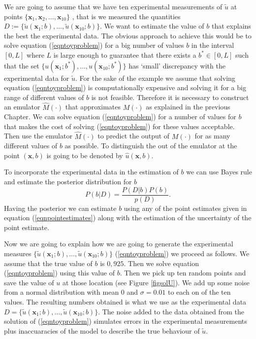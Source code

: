 \documentclass[12pt]{book}
\newcommand{\x}{\textbf{x}}
\begin{document}
We are going to assume that we have ten experimental measurements 
of $\tilde{u}$ at points $\{\x_{1},\x_{2},\ldots,\x_{10}\}$ , that is we measured the quantities 
$D:=\{\tilde{u}(\x_{1};b),\ldots,\tilde{u}(\x_{10};b)\}$.
We want to estimate the value of $b$ that explains the best the experimental data. The obvious approach to achieve this
would be to solve equation (\ref{eqntoyproblem}) for a big number of values $b$ in the interval $[0,L]$ where $L$ 
is large enough to guarantee that there exists a $b^{*}\in [0,L]$ such that the set $\{u(\x_{1};b^{*}),\ldots,u(\x_{10};b^{*})\}$
has `small' discrepancy with the experimental data for $\tilde{u}$. For the sake of the example we assume that solving
equation (\ref{eqntoyproblem}) is computationally expensive and solving it for a big range of different values of $b$
is not feasible. Therefore it is necessary to construct an emulator $\hat{M}(\cdot)$ that approximates $M(\cdot)$ as
explained in the previous Chapter. We can solve equation (\ref{eqntoyproblem}) for a number of values for $b$
that makes the cost of solving (\ref{eqntoyproblem}) for these values acceptable. Then use the emulator
$\hat{M}(\cdot)$ to predict the output of $M(\cdot)$ for as many different values of $b$ as possible. 
To distinguish the out of the emulator at the point $(\x,b)$ is going to be denoted by $\hat{u}(\x,b)$.
\newline

To incorporate the experimental data in the estimation of $b$ we can use Bayes rule and estimate the posterior distribution for $b$
\begin{equation}\label{eqnpropto}
P(b|D)=\frac{P(D|b)P(b)}{p(D)}.
\end{equation}
Having the posterior we can estimate $b$ using any of the point estimates given in equation (\ref{eqnpointestimates}) along
with the estimation of the uncertainty of the point estimate.
\newline

Now we are going to explain how we are going to generate the experimental measures $\{\tilde{u}(\x_{1};b),\ldots,\tilde{u}(\x_{10};b)\}$
 (\ref{eqntoyproblem}) we proceed as follows. We assume that the true value of $b$ is $0,925$. Then we solve equation (\ref{eqntoyproblem})
using this value of $b$. Then we pick up ten random points and save the value of $u$ at those location (see Figure \ref{figsolU}).  We add up some noise from
a normal distribution with mean $0$ and $\sigma=0.01$ to each on of the ten values. The resulting numbers obtained is what we use
as the experimental data $D=\{\tilde{u}(\x_{1};b),\ldots,\tilde{u}(\x_{10};b)\}$. The noise added to the data obtained from the solution of
(\ref{eqntoyproblem}) simulates errors in the experimental measurements plus inaccuaracies of the model to describe the true behaviour of $\tilde{u}$.
\end{document}
